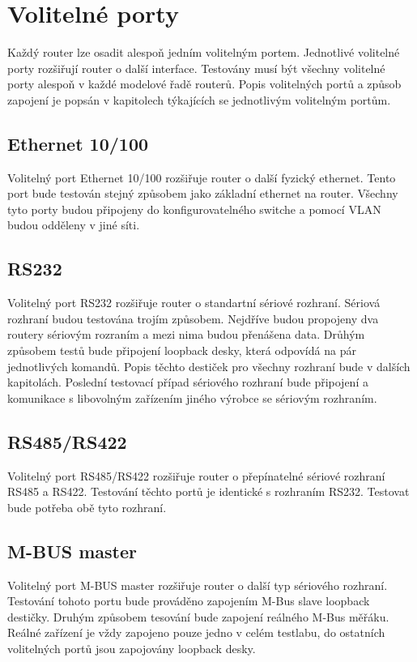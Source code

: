 \section{Volitelné porty}
Každý router lze osadit alespoň jedním volitelným portem. Jednotlivé volitelné porty rozšiřují router o další interface. Testovány musí být všechny volitelné porty alespoň v každé modelové řadě routerů. Popis volitelných portů a způsob zapojení je popsán v kapitolech týkajících se jednotlivým volitelným portům.

\subsection{Ethernet 10/100}
Volitelný port Ethernet 10/100 rozšiřuje router o další fyzický ethernet. Tento port bude testován stejný způsobem jako základní ethernet na router. Všechny tyto porty budou připojeny do konfigurovatelného switche a pomocí VLAN budou odděleny v jiné síti.

\subsection{RS232}
Volitelný port RS232 rozšiřuje router o standartní sériové rozhraní. Sériová rozhraní budou testována trojím způsobem. Nejdříve budou propojeny dva routery sériovým rozraním a mezi nima budou přenášena data. Drůhým způsobem testů bude připojení loopback desky, která odpovídá na pár jednotlivých komandů. Popis těchto destiček pro všechny rozhraní bude v dalších kapitolách. Poslední testovací případ sériového rozhraní bude připojení a komunikace s libovolným zařízením jiného výrobce se sériovým rozhraním.

\subsection{RS485/RS422}
Volitelný port RS485/RS422 rozšiřuje router o přepínatelné sériové rozhraní RS485 a RS422. Testování těchto portů je identické s rozhraním RS232. Testovat bude potřeba obě tyto rozhraní.

\subsection{M-BUS master}
Volitelný port M-BUS master rozšiřuje router o další typ sériového rozhraní. Testování tohoto portu bude prováděno zapojením M-Bus slave loopback destičky. Druhým způsobem tesování bude zapojení reálného M-Bus měřáku. Reálné zařízení je vždy zapojeno pouze jedno v celém testlabu, do ostatních volitelných portů jsou zapojovány loopback desky.

